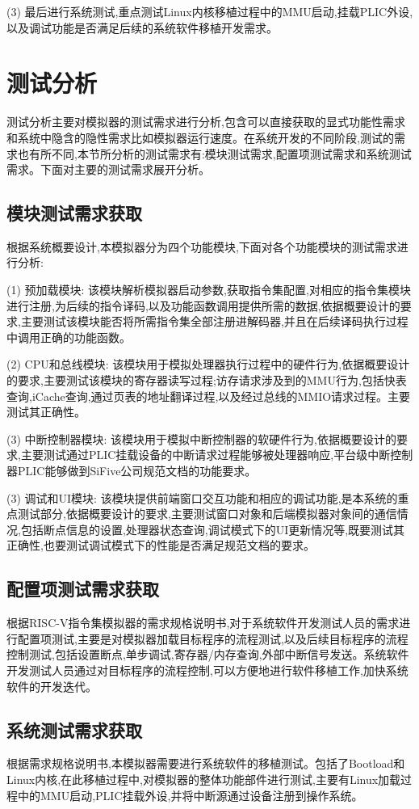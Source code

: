 (3) 最后进行系统测试,重点测试Linux内核移植过程中的MMU启动,挂载PLIC外设,以及调试功能是否满足后续的系统软件移植开发需求。


\section{测试分析}
测试分析主要对模拟器的测试需求进行分析,包含可以直接获取的显式功能性需求和系统中隐含的隐性需求比如模拟器运行速度。在系统开发的不同阶段,测试的需求也有所不同,本节所分析的测试需求有:模块测试需求,配置项测试需求和系统测试需求。下面对主要的测试需求展开分析。

\subsection{模块测试需求获取}
根据系统概要设计,本模拟器分为四个功能模块,下面对各个功能模块的测试需求进行分析:


(1) 预加载模块: 该模块解析模拟器启动参数,获取指令集配置,对相应的指令集模块进行注册,为后续的指令译码,以及功能函数调用提供所需的数据,依据概要设计的要求,主要测试该模块能否将所需指令集全部注册进解码器,并且在后续译码执行过程中调用正确的功能函数。


(2) CPU和总线模块: 该模块用于模拟处理器执行过程中的硬件行为,依据概要设计的要求,主要测试该模块的寄存器读写过程;访存请求涉及到的MMU行为,包括快表查询,iCache查询,通过页表的地址翻译过程,以及经过总线的MMIO请求过程。主要测试其正确性。


(3) 中断控制器模块: 该模块用于模拟中断控制器的软硬件行为,依据概要设计的要求,主要测试通过PLIC挂载设备的中断请求过程能够被处理器响应,平台级中断控制器PLIC能够做到SiFive公司规范文档的功能要求。

(3) 调试和UI模块: 该模块提供前端窗口交互功能和相应的调试功能,是本系统的重点测试部分,依据概要设计的要求,主要测试窗口对象和后端模拟器对象间的通信情况,包括断点信息的设置,处理器状态查询,调试模式下的UI更新情况等,既要测试其正确性,也要测试调试模式下的性能是否满足规范文档的要求。


\subsection{配置项测试需求获取}
根据RISC-V指令集模拟器的需求规格说明书,对于系统软件开发测试人员的需求进行配置项测试,主要是对模拟器加载目标程序的流程测试,以及后续目标程序的流程控制测试,包括设置断点,单步调试,寄存器/内存查询,外部中断信号发送。系统软件开发测试人员通过对目标程序的流程控制,可以方便地进行软件移植工作,加快系统软件的开发迭代。

\subsection{系统测试需求获取}
根据需求规格说明书,本模拟器需要进行系统软件的移植测试。包括了Bootload和Linux内核,在此移植过程中,对模拟器的整体功能部件进行测试,主要有Linux加载过程中的MMU启动,PLIC挂载外设,并将中断源通过设备注册到操作系统。

